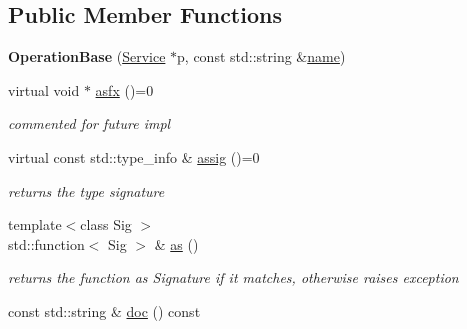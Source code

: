 \subsection*{Public Member Functions}
\begin{DoxyCompactItemize}
\item 
\hypertarget{classcoco_1_1_operation_base_aae9b74463779d30dca29a439213b7066}{}{\bfseries Operation\+Base} (\hyperlink{classcoco_1_1_service}{Service} $\ast$p, const std\+::string \&\hyperlink{classcoco_1_1_operation_base_aee0ff9e503d67abe3260e808fec4a183}{name})\label{classcoco_1_1_operation_base_aae9b74463779d30dca29a439213b7066}

\item 
virtual void $\ast$ \hyperlink{classcoco_1_1_operation_base_a298735d41b5fa6f69ecbcec833e4127f}{asfx} ()=0
\begin{DoxyCompactList}\small\item\em commented for future impl \end{DoxyCompactList}\item 
\hypertarget{classcoco_1_1_operation_base_a858f1db28251468bba10f25b858851d7}{}virtual const std\+::type\+\_\+info \& \hyperlink{classcoco_1_1_operation_base_a858f1db28251468bba10f25b858851d7}{assig} ()=0\label{classcoco_1_1_operation_base_a858f1db28251468bba10f25b858851d7}

\begin{DoxyCompactList}\small\item\em returns the type signature \end{DoxyCompactList}\item 
\hypertarget{classcoco_1_1_operation_base_a3c71b11a14371ef3a160b49ff8b16dc9}{}{\footnotesize template$<$class Sig $>$ }\\std\+::function$<$ Sig $>$ \& \hyperlink{classcoco_1_1_operation_base_a3c71b11a14371ef3a160b49ff8b16dc9}{as} ()\label{classcoco_1_1_operation_base_a3c71b11a14371ef3a160b49ff8b16dc9}

\begin{DoxyCompactList}\small\item\em returns the function as Signature if it matches, otherwise raises exception \end{DoxyCompactList}\item 
\hypertarget{classcoco_1_1_operation_base_afe4be0f5e168e05e614cec82619a0eda}{}const std\+::string \& \hyperlink{classcoco_1_1_operation_base_afe4be0f5e168e05e614cec82619a0eda}{doc} () const \label{classcoco_1_1_operation_base_afe4be0f5e168e05e614cec82619a0eda}


\end{DoxyCompactItemize}
